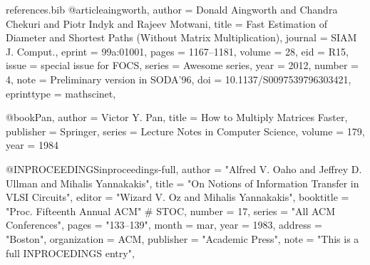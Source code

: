 \begin{filecontents}{references.bib}
@article{aingworth,
author = {Donald Aingworth and Chandra Chekuri and Piotr Indyk and Rajeev Motwani},
title = {Fast Estimation of Diameter and Shortest Paths (Without Matrix Multiplication)},
journal = {SIAM J. Comput.},
eprint = {99a:01001},
pages = {1167--1181},
volume = 28,
eid = {R15},
issue = {special issue for FOCS},
series = {Awesome series},
year = 2012,
number = 4,
note = {Preliminary version in SODA'96},
doi = {10.1137/S0097539796303421},
eprinttype = {mathscinet},
}

@book{Pan,
  author    = {Victor Y. Pan},
  title     = {How to Multiply Matrices Faster},
  publisher = {Springer},
  series    = {Lecture Notes in Computer Science},
  volume    = {179},
  year      = {1984}
}

@INPROCEEDINGS{inproceedings-full,
   author = "Alfred V. Oaho and Jeffrey D. Ullman and Mihalis Yannakakis",
   title = "On Notions of Information Transfer in {VLSI} Circuits",
   editor = "Wizard V. Oz and Mihalis Yannakakis",
   booktitle = "Proc. Fifteenth Annual ACM" # STOC,
   number = 17,
   series = "All ACM Conferences",
   pages = "133--139",
   month = mar,
   year = 1983,
   address = "Boston",
   organization = ACM,
   publisher = "Academic Press",
   note = "This is a full INPROCEDINGS entry",
}

\end{filecontents}

\documentclass{article}
\providecommand\noopsort[1]{}
\usepackage{graphicx}
\usepackage[%
 backend   =  biber   , 
 style     = trad-plain,
]{biblatex}




\cite{inproceedings-full}
\printbibliography

